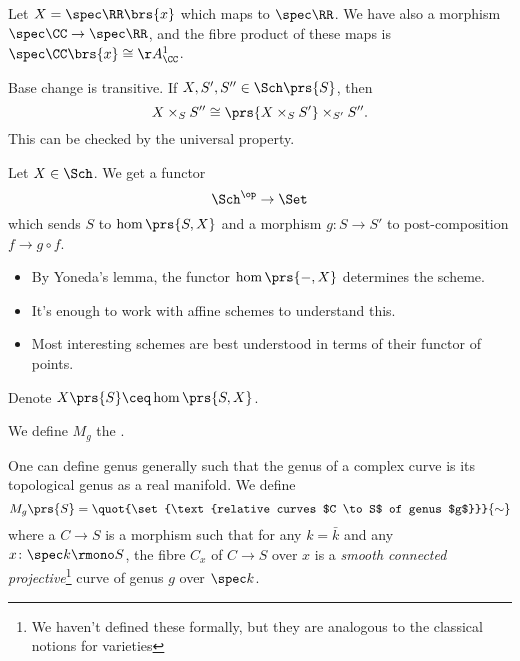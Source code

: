 \documentclass[10pt,a4paper,twoside,openany,hidelinks]{book}
\begin{document}
\begin{example}
Let $X = \spec \RR\brs{x}$ which maps to $\spec \RR$. We have also a morphism $\spec \CC \to \spec \RR$, and the fibre product of these maps is $\spec \CC\brs{x} \cong \AA_\CC^1$.
\end{example}

\begin{remark}
Base change is transitive. If $X,S',S'' \in \Sch\prs{S}$, then
$$X \times_{S} S'' \cong \prs{X \times_S S'} \times_{S'} S'' \text{.}$$
This can be checked by the universal property.
\end{remark}

\begin{definition}
Let $X \in \Sch$. We get a functor
$$\Sch^{\op} \to \Set$$
which sends $S$ to $\hom \prs{S,X}$ and a morphism $g \colon S \to S'$ to post-composition $f \to g \circ f$.
\end{definition}

\begin{remark}
\begin{itemize}
    \item
    By Yoneda's lemma, the functor $\hom\prs{-,X}$ determines the scheme.
    \item
    It's enough to work with affine schemes to understand this.
    \item
    Most interesting schemes are best understood in terms of their functor of points.
\end{itemize}
\end{remark}

\begin{notation}
Denote $X\prs{S} \ceq \hom\prs{S,X}$.
\end{notation}

\begin{example}
We define $M_g$ the .

One can define genus generally such that the genus of a complex curve is its topological genus as a real manifold.
We define
$$M_g\prs{S} = \quot{\set{\text{relative curves $C \to S$ of genus $g$}}}{\sim}$$
where a  $C \to S$ is a morphism such that for any $k = \bar{k}$ and any $x \colon \spec k \rmono S$, the fibre $C_x$ of $C \to S$ over $x$ is a \emph{smooth connected projective}\footnote{We haven't defined these formally, but they are analogous to the classical notions for varieties} curve of genus $g$ over $\spec k$.
\end{example}
\end{document}
